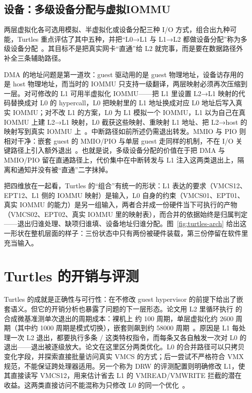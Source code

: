 \subsection{设备：多级设备分配与虚拟IOMMU}\label{sec:nested-dev}

两层虚拟化各可选用模拟、半虚拟化或设备分配三种 I/O 方式，组合出九种可能，Turtles 重点评估了其中五种，并把“L0→L1 与 L1→L2 都做设备分配”称为多级设备分配~\cite{source7}。其目标不是把真实网卡“直通”给 L2 就完事，而是要在数据路径外补全三条辅助路径。

DMA 的地址问题是第一道坎：guest 驱动用的是 guest 物理地址，设备访存用的是 host 物理地址，而当时的 IOMMU 只支持一级翻译，两层映射必须再次压缩到一层。对可修改的 L1 可用半虚拟化 IOMMU——把 L1 里设置 L2→L1 映射的代码替换成对 L0 的 hypercall，L0 把映射里的 L1 地址换成对应 L0 地址后写入真实 IOMMU；对不改 L1 的方案，L0 为 L1 模拟一个 IOMMU，L1 以为自己在真 IOMMU 上建 L2→L1 映射，L0 截获这些映射、重映射 L1 地址、把 L2→host 的映射写到真实 IOMMU 上~\cite{source7}。中断路径如前所述仍需退出转发。MMIO 与 PIO 则相对干净：嵌套 guest 的 MMIO/PIO 与单层 guest 走同样的机制，不在 I/O 关键路径上引入额外退出~\cite{source7}。也就是说，多级设备分配的价值在于把 DMA 与 MMIO/PIO 留在直通路径上，代价集中在中断转发与 L1 注入这两类退出上，隔离和通知并没有被“直通”二字抹掉。

把四维放在一起看，Turtles 的“组合”有统一的形状：L1 表达的要求（VMCS12、EPT12、L1 侧的 IOMMU 映射）是输入，L0 自身的约束（VMCS01、EPT01、真实 IOMMU 的能力）是另一组输入，两者合并成一份硬件当下可执行的产物（VMCS02、EPT02、真实 IOMMU 里的映射表），而合并的依据始终是归属判定——退出归谁处理、缺项归谁填、设备地址归谁分配。图~\ref{fig:turtles-arch} 给出这一形状在整机层面的样子：三份状态中只有两份被硬件装载，第三份停留在软件里充当输入。

\section{Turtles 的开销与评测}\label{sec:turtles-cost}

Turtles 的成就是正确性与可行性：在不修改 guest hypervisor 的前提下给出了嵌套语义。但它的开销分析也暴露了问题的下一层形态。论文用 L2 里循环执行  的合成微基准测单次退出的周期成本：裸机上  约 100 周期，单层虚拟化约 2600 周期（其中约 1000 周期是模式切换），嵌套则飙到约 58000 周期~\cite{source7}。原因是 L1 每处理一次 L2 退出，都要执行多条 / 这类特权指令，而每条又各自触发一次对 L0 的退出——退出被逐级放大。论文在这里区分两类优化。L0 的合并路径可以只拷贝变化字段，并探索直接批量访问真实 VMCS 的方式；后一尝试不严格符合 VMX 规范，不能保证跨处理器适用。另一个称为 DRW 的评测配置则明确修改 L1，使其直接读写 VMCS12，用来估计省去 L1 的 VMREAD/VMWRITE 拦截的潜在收益。这两类直接访问不能混称为只修改 L0 的同一个优化~\cite{source7}。

